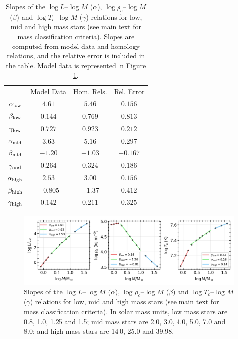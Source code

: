 \begin{table}[h!]
    \centering
    \captionsetup[table]{width=0.8\textwidth}
    \caption{\small Slopes of the $\log L \text{--} \log M$ ($\alpha$), $\log \rho_c \text{--} \log M$ ($\beta$) and $\log T_c  \text{--} \log M$ ($\gamma$) relations for low, mid and high mass stars (see main text for mass classification criteria). Slopes are computed from model data and homology relations, and the relative error is included in the table. Model data is represented in Figure \ref{fig:regressions}.}
    \begin{tabular}{|c|c|c|c|}
        \cline{2-4}
        \multicolumn{1}{c|}{} & Model Data & Hom. Rels. & Rel. Error \\ \cline{2-4}\noalign{\vspace{0.2em}}\hline
        $\alpha_{\rm low}$    & $4.61$     & $5.46$     & $0.156$    \\ \hline
        $\beta_{\rm low}$     & $0.144$    & $0.769 $   & $0.813$    \\ \hline
        $\gamma_{\rm low}$    & $0.727 $   & $0.923 $   & $0.212$    \\ \hline\hline
        $\alpha_{\rm mid}$    & $3.63$     & $5.16$     & $0.297$    \\ \hline
        $\beta_{\rm mid}$     & $-1.20$    & $-1.03$    & $-0.167$   \\ \hline
        $\gamma_{\rm mid}$    & $0.264$    & $0.324$    & $0.186$    \\ \hline\hline
        $\alpha_{\rm high}$   & $2.53   $  & $3.00$     & $0.156$    \\ \hline
        $\beta_{\rm high}$    & $- 0.805$  & $-1.37$    & $0.412 $   \\ \hline
        $\gamma_{\rm high}$   & $0.142$    & $0.211$    & $ 0.325$   \\ \hline
    \end{tabular}
    \label{tab:regression}
\end{table}


\begin{figure}[h]
    \centering
    \includegraphics[width=1.0\textwidth]{../figures/regressions.png}  %
    \caption{\small Slopes of the $\log L \text{--} \log M$ ($\alpha$), $\log \rho_c \text{--} \log M$ ($\beta$) and $\log T_c  \text{--} \log M$ ($\gamma$) relations for low, mid and high mass stars (see main text for mass classification criteria). In solar mass units, low mass stars are 0.8, 1.0, 1.25 and 1.5; mid mass stars are 2.0, 3.0, 4.0, 5.0, 7.0 and 8.0; and high mass stars are 14.0, 25.0 and 39.98.}
    \label{fig:regressions}
\end{figure}




